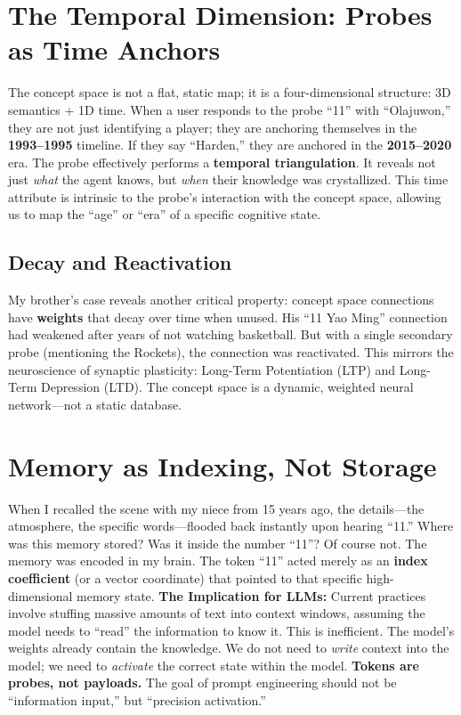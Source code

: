 \documentclass[12pt, a4paper]{article}
\begin{document}
\section{The Temporal Dimension: Probes as Time Anchors}
The concept space is not a flat, static map; it is a four-dimensional structure: 3D semantics + 1D time.
When a user responds to the probe ``11'' with ``Olajuwon,'' they are not just identifying a player; they are anchoring themselves in the \textbf{1993--1995} timeline. If they say ``Harden,'' they are anchored in the \textbf{2015--2020} era.
The probe effectively performs a \textbf{temporal triangulation}. It reveals not just \textit{what} the agent knows, but \textit{when} their knowledge was crystallized. This time attribute is intrinsic to the probe's interaction with the concept space, allowing us to map the ``age'' or ``era'' of a specific cognitive state.
\subsection{Decay and Reactivation}
My brother's case reveals another critical property: concept space connections have \textbf{weights} that decay over time when unused. His ``11     Yao Ming'' connection had weakened after years of not watching basketball. But with a single secondary probe (mentioning the Rockets), the connection was reactivated.
This mirrors the neuroscience of synaptic plasticity: Long-Term Potentiation (LTP) and Long-Term Depression (LTD). The concept space is a dynamic, weighted neural network---not a static database.
\section{Memory as Indexing, Not Storage}
When I recalled the scene with my niece from 15 years ago, the details---the atmosphere, the specific words---flooded back instantly upon hearing ``11.'' Where was this memory stored? Was it inside the number ``11''? Of course not.
The memory was encoded in my brain. The token ``11'' acted merely as an \textbf{index coefficient} (or a vector coordinate) that pointed to that specific high-dimensional memory state.
\textbf{The Implication for LLMs:}
Current practices involve stuffing massive amounts of text into context windows, assuming the model needs to ``read'' the information to know it. This is inefficient. The model's weights already contain the knowledge. We do not need to \textit{write} context into the model; we need to \textit{activate} the correct state within the model.
\textbf{Tokens are probes, not payloads.} The goal of prompt engineering should not be ``information input,'' but ``precision activation.''
\end{document}
